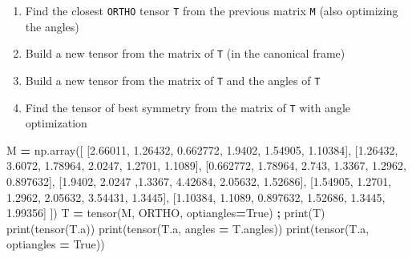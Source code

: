 \documentclass[
  a4paper,
  numbers=noendperiod,
  DIV=12]{scrreprt}
\newenvironment{Shaded}{\begin{snugshade}}{\end{snugshade}}
\newcommand{\BuiltInTok}[1]{#1}
\newcommand{\FloatTok}[1]{\textcolor[rgb]{0.00,0.00,0.81}{#1}}
\newcommand{\NormalTok}[1]{#1}
\newcommand{\OperatorTok}[1]{\textcolor[rgb]{0.81,0.36,0.00}{\textbf{#1}}}
\newcommand{\VariableTok}[1]{\textcolor[rgb]{0.00,0.00,0.00}{#1}}
\begin{document}
\begin{tcolorbox}[enhanced jigsaw, title={Exercise}, left=2mm, titlerule=0mm, colback=white, breakable, colframe=quarto-callout-caution-color-frame, bottomtitle=1mm, toptitle=1mm, rightrule=.15mm, bottomrule=.15mm, coltitle=black, opacitybacktitle=0.6, arc=.35mm, colbacktitle=quarto-callout-caution-color!10!white, leftrule=.75mm, opacityback=0, toprule=.15mm]

\begin{enumerate}
\def\labelenumi{\arabic{enumi}.}
\item
  Find the closest \texttt{ORTHO} tensor \texttt{T} from the previous
  matrix \texttt{M} (also optimizing the angles)
\item
  Build a new tensor from the matrix of \texttt{T} (in the canonical
  frame)
\item
  Build a new tensor from the matrix of \texttt{T} and the angles of
  \texttt{T}
\item
  Find the tensor of best symmetry from the matrix of \texttt{T} with
  angle optimization
\end{enumerate}

\begin{Shaded}
\begin{Highlighting}[]
\NormalTok{M }\OperatorTok{=}\NormalTok{ np.array([ [}\FloatTok{2.66011}\NormalTok{, }\FloatTok{1.26432}\NormalTok{, }\FloatTok{0.662772}\NormalTok{, }\FloatTok{1.9402}\NormalTok{, }\FloatTok{1.54905}\NormalTok{, }\FloatTok{1.10384}\NormalTok{],}
\NormalTok{               [}\FloatTok{1.26432}\NormalTok{, }\FloatTok{3.6072}\NormalTok{, }\FloatTok{1.78964}\NormalTok{, }\FloatTok{2.0247}\NormalTok{, }\FloatTok{1.2701}\NormalTok{, }\FloatTok{1.1089}\NormalTok{], }
\NormalTok{               [}\FloatTok{0.662772}\NormalTok{, }\FloatTok{1.78964}\NormalTok{, }\FloatTok{2.743}\NormalTok{, }\FloatTok{1.3367}\NormalTok{, }\FloatTok{1.2962}\NormalTok{, }\FloatTok{0.897632}\NormalTok{], }
\NormalTok{               [}\FloatTok{1.9402}\NormalTok{, }\FloatTok{2.0247}\NormalTok{ ,}\FloatTok{1.3367}\NormalTok{, }\FloatTok{4.42684}\NormalTok{, }\FloatTok{2.05632}\NormalTok{, }\FloatTok{1.52686}\NormalTok{], }
\NormalTok{               [}\FloatTok{1.54905}\NormalTok{, }\FloatTok{1.2701}\NormalTok{, }\FloatTok{1.2962}\NormalTok{, }\FloatTok{2.05632}\NormalTok{, }\FloatTok{3.54431}\NormalTok{, }\FloatTok{1.3445}\NormalTok{], }
\NormalTok{               [}\FloatTok{1.10384}\NormalTok{, }\FloatTok{1.1089}\NormalTok{, }\FloatTok{0.897632}\NormalTok{, }\FloatTok{1.52686}\NormalTok{, }\FloatTok{1.3445}\NormalTok{, }\FloatTok{1.99356}\NormalTok{] ])}
\NormalTok{T }\OperatorTok{=}\NormalTok{ tensor(M, ORTHO, optiangles}\OperatorTok{=}\VariableTok{True}\NormalTok{) }\OperatorTok{;} \BuiltInTok{print}\NormalTok{(T)}
\BuiltInTok{print}\NormalTok{(tensor(T.a))}
\BuiltInTok{print}\NormalTok{(tensor(T.a, angles }\OperatorTok{=}\NormalTok{ T.angles))}
\BuiltInTok{print}\NormalTok{(tensor(T.a, optiangles }\OperatorTok{=} \VariableTok{True}\NormalTok{))}
\end{Highlighting}
\end{Shaded}


\end{tcolorbox}
\end{document}
